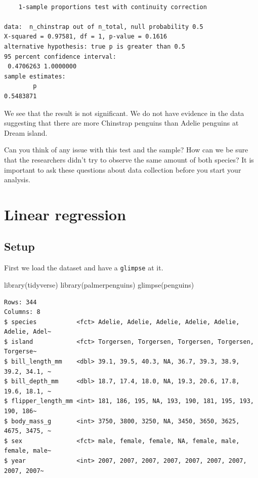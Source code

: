\documentclass[
  letterpaper,
  DIV=11,
  numbers=noendperiod]{scrreprt}
\newenvironment{Shaded}{\begin{snugshade}}{\end{snugshade}}
\newcommand{\FunctionTok}[1]{\textcolor[rgb]{0.28,0.35,0.67}{#1}}
\newcommand{\NormalTok}[1]{\textcolor[rgb]{0.00,0.23,0.31}{#1}}
\begin{document}
\begin{verbatim}

    1-sample proportions test with continuity correction

data:  n_chinstrap out of n_total, null probability 0.5
X-squared = 0.97581, df = 1, p-value = 0.1616
alternative hypothesis: true p is greater than 0.5
95 percent confidence interval:
 0.4706263 1.0000000
sample estimates:
        p 
0.5483871 
\end{verbatim}

We see that the result is not significant. We do not have evidence in
the data suggesting that there are more Chinstrap penguins than Adelie
penguins at Dream island.

Can you think of any issue with this test and the sample? How can we be
sure that the researchers didn't try to observe the same amount of both
species? It is important to ask these questions about data collection
before you start your analysis.

\chapter{Linear regression}\label{linear-regression}

\section{Setup}\label{setup-1}

First we load the dataset and have a \texttt{glimpse} at it.

\begin{Shaded}
\begin{Highlighting}[]
\FunctionTok{library}\NormalTok{(tidyverse)}
\FunctionTok{library}\NormalTok{(palmerpenguins)}
\FunctionTok{glimpse}\NormalTok{(penguins)}
\end{Highlighting}
\end{Shaded}

\begin{verbatim}
Rows: 344
Columns: 8
$ species           <fct> Adelie, Adelie, Adelie, Adelie, Adelie, Adelie, Adel~
$ island            <fct> Torgersen, Torgersen, Torgersen, Torgersen, Torgerse~
$ bill_length_mm    <dbl> 39.1, 39.5, 40.3, NA, 36.7, 39.3, 38.9, 39.2, 34.1, ~
$ bill_depth_mm     <dbl> 18.7, 17.4, 18.0, NA, 19.3, 20.6, 17.8, 19.6, 18.1, ~
$ flipper_length_mm <int> 181, 186, 195, NA, 193, 190, 181, 195, 193, 190, 186~
$ body_mass_g       <int> 3750, 3800, 3250, NA, 3450, 3650, 3625, 4675, 3475, ~
$ sex               <fct> male, female, female, NA, female, male, female, male~
$ year              <int> 2007, 2007, 2007, 2007, 2007, 2007, 2007, 2007, 2007~
\end{verbatim}
\end{document}
